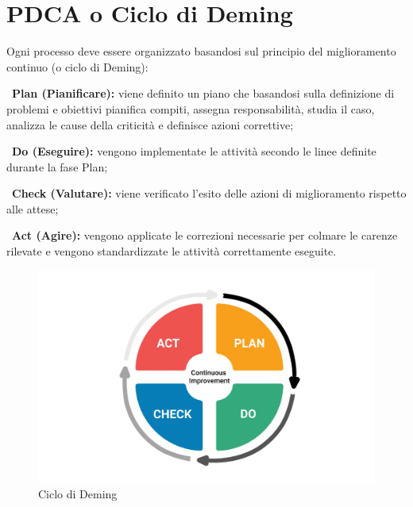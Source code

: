 \section{PDCA o Ciclo di Deming}
\label{A}
Ogni processo deve essere organizzato basandosi sul principio del miglioramento continuo (o ciclo di Deming\pedice):

~\newline\textbf{Plan (Pianificare):} viene definito un piano che basandosi sulla definizione di problemi e obiettivi pianifica compiti, assegna responsabilità, studia il caso, analizza le cause della criticità e definisce azioni correttive;

~\newline\textbf{Do (Eseguire):} vengono implementate le attività secondo le linee definite durante la fase Plan;

~\newline\textbf{Check (Valutare):} viene verificato l’esito delle azioni di miglioramento rispetto alle attese;

~\newline\textbf{Act (Agire):} vengono applicate le correzioni necessarie per colmare le carenze rilevate e vengono standardizzate le attività correttamente eseguite.

\begin{figure}[!htbp]
	\centering
	\includegraphics[scale=0.3]{pdca.png}
	\caption{Ciclo di Deming}
\end{figure}

\clearpage

